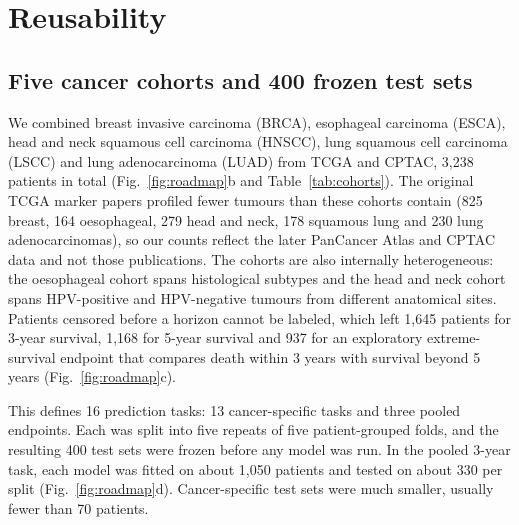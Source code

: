 \section*{Reusability}

\subsection*{Five cancer cohorts and 400 frozen test sets}

We combined breast invasive carcinoma (BRCA), esophageal carcinoma (ESCA), head and neck squamous cell carcinoma (HNSCC), lung squamous cell carcinoma (LSCC) and lung adenocarcinoma (LUAD) from TCGA and CPTAC, 3,238 patients in total (Fig.~\ref{fig:roadmap}b and Table~\ref{tab:cohorts}).\citep{tcga2012brca,tcga2017esca,tcga2015hnsc,tcga2012lusc,tcga2014luad,liu2018clinical,li2023pancancer} The original TCGA marker papers profiled fewer tumours than these cohorts contain (825 breast, 164 oesophageal, 279 head and neck, 178 squamous lung and 230 lung adenocarcinomas),\citep{tcga2012brca,tcga2017esca,tcga2015hnsc,tcga2012lusc,tcga2014luad} so our counts reflect the later PanCancer Atlas and CPTAC data and not those publications. The cohorts are also internally heterogeneous: the oesophageal cohort spans histological subtypes and the head and neck cohort spans HPV-positive and HPV-negative tumours from different anatomical sites.\citep{tcga2017esca,tcga2015hnsc} Patients censored before a horizon cannot be labeled, which left 1,645 patients for 3-year survival, 1,168 for 5-year survival and 937 for an exploratory extreme-survival endpoint that compares death within 3 years with survival beyond 5 years (Fig.~\ref{fig:roadmap}c).

This defines 16 prediction tasks: 13 cancer-specific tasks and three pooled endpoints. Each was split into five repeats of five patient-grouped folds, and the resulting 400 test sets were frozen before any model was run. In the pooled 3-year task, each model was fitted on about 1,050 patients and tested on about 330 per split (Fig.~\ref{fig:roadmap}d). Cancer-specific test sets were much smaller, usually fewer than 70 patients.

\begin{table}[ht]
\centering
\caption{Cancer cohort size and endpoint eligibility. Extreme survival contrasts death within 3 years against survival beyond 5 years. NA, endpoint-specific cohort not formed.}
\label{tab:cohorts}

\end{table}


